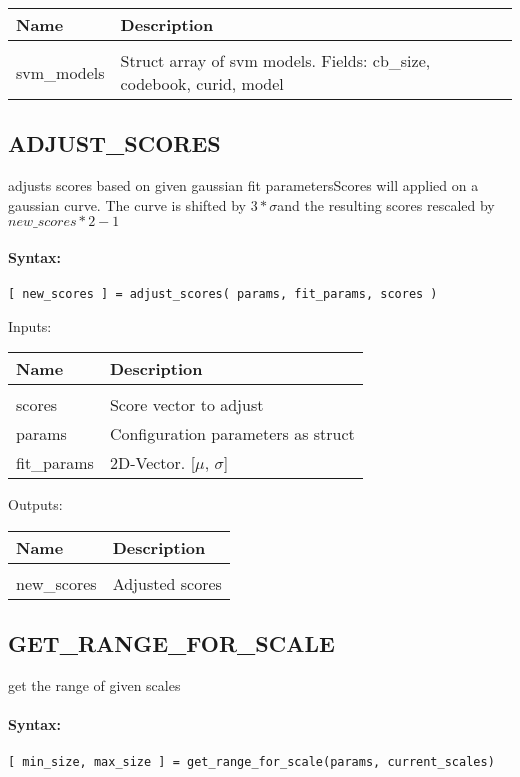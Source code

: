 \begin{tabular}{|l|p{5cm}|}
\hline
\textbf{Name} & \textbf{Description} \\
\hline \hline \\
svm\_models & Struct array of svm models. Fields: cb\_size, codebook, curid, model  \\ \hline
\end{tabular}

\subsection{ADJUST\_SCORES}

adjusts scores based on given gaussian fit parametersScores will applied on a gaussian curve. The curve is shifted by $3 * \sigma$and the resulting scores rescaled by $new\_scores * 2 - 1$

\paragraph{Syntax:} \verb|[ new_scores ] = adjust_scores( params, fit_params, scores )|

Inputs:

\begin{tabular}{|l|p{5cm}|}
\hline
\textbf{Name} & \textbf{Description} \\
\hline \hline \\
scores & Score vector to adjust  \\ \hline
params & Configuration parameters as struct  \\ \hline
fit\_params & 2D-Vector. [$\mu$, $\sigma$]  \\ \hline
\end{tabular}
Outputs:

\begin{tabular}{|l|p{5cm}|}
\hline
\textbf{Name} & \textbf{Description} \\
\hline \hline \\
new\_scores & Adjusted scores  \\ \hline
\end{tabular}

\subsection{GET\_RANGE\_FOR\_SCALE}

get the range of given scales

\paragraph{Syntax:} \verb|[ min_size, max_size ] = get_range_for_scale(params, current_scales)|

